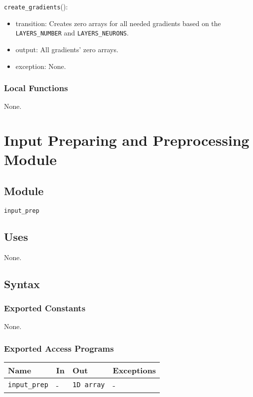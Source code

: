 \documentclass[12pt, titlepage]{article}
\def\code#1{\texttt{#1}}
\begin{document}
\noindent \code{create\_gradients}():
\begin{itemize}
  \item transition: Creates zero arrays for all needed gradients based on the 
  \code{LAYERS\_NUMBER} and \code{LAYERS\_NEURONS}.
  \item output: All gradients' zero arrays.
  \item exception: None.
\end{itemize}

\subsubsection{Local Functions}
None.

\section{Input Preparing and Preprocessing Module} \label{In-prep} 

\subsection{Module}
\code{input\_prep} 

\subsection{Uses}
None.

\subsection{Syntax}
\subsubsection{Exported Constants}
None.

\subsubsection{Exported Access Programs}

\begin{center}
\begin{tabular}{p{3.5cm} p{4cm} p{4cm} p{2cm}}
\hline
\textbf{Name} & \textbf{In} & \textbf{Out} & \textbf{Exceptions} \\
\hline
\code{input\_prep} & - & \code{1D array} & - \\
\hline
\end{tabular}
\end{center}
\end{document}
